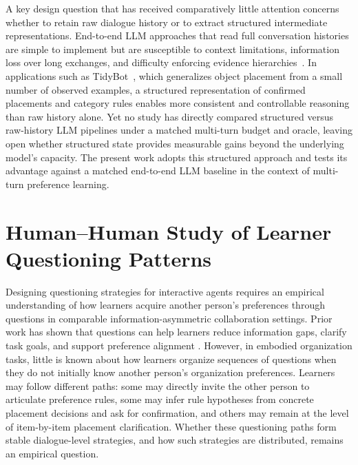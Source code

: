 \documentclass[manuscript,review,anonymous]{acmart}
\begin{document}
A key design question that has received comparatively little attention concerns whether to retain raw dialogue history or to extract structured intermediate representations. End-to-end LLM approaches that read full conversation histories are simple to implement but are susceptible to context limitations, information loss over long exchanges, and difficulty enforcing evidence hierarchies~\cite{tyshka2023interactive}. In applications such as TidyBot~\cite{wu2023tidybot}, which generalizes object placement from a small number of observed examples, a structured representation of confirmed placements and category rules enables more consistent and controllable reasoning than raw history alone. Yet no study has directly compared structured versus raw-history LLM pipelines under a matched multi-turn budget and oracle, leaving open whether structured state provides measurable gains beyond the underlying model's capacity. The present work adopts this structured approach and tests its advantage against a matched end-to-end LLM baseline in the context of multi-turn preference learning.

\section{Human--Human Study of Learner Questioning Patterns}
\label{sec:hhi}

Designing questioning strategies for interactive agents requires an empirical understanding of how learners acquire another person's preferences through questions in comparable information-asymmetric collaboration settings. Prior work has shown that questions can help learners reduce information gaps, clarify task goals, and support preference alignment \citep{cakmak2012designing, biyik2019asking}. However, in embodied organization tasks, little is known about how learners organize sequences of questions when they do not initially know another person's organization preferences. Learners may follow different paths: some may directly invite the other person to articulate preference rules, some may infer rule hypotheses from concrete placement decisions and ask for confirmation, and others may remain at the level of item-by-item placement clarification. Whether these questioning paths form stable dialogue-level strategies, and how such strategies are distributed, remains an empirical question.
\end{document}
